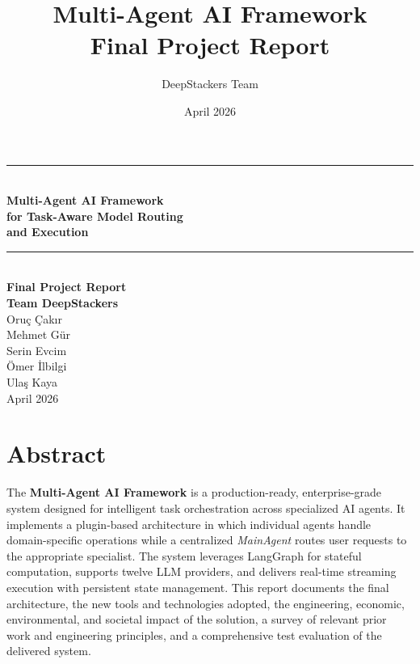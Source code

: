 \documentclass[11pt,a4paper]{report}
\title{\Huge\sffamily\bfseries Multi-Agent AI Framework\\[0.4em]
\LARGE\mdseries Final Project Report}
\author{\sffamily DeepStackers Team}
\date{\sffamily April 2026}
\begin{document}
\begin{titlepage}
  \centering
  \vspace*{2cm}
  {\color{RuleGray}\rule{\linewidth}{0.8pt}}\\[1.5em]
  {\sffamily\Huge\bfseries\color{PrimaryBlue} Multi-Agent AI Framework}\\[1.5em]
  {\sffamily\LARGE\bfseries\color{PrimaryBlue} for Task-Aware Model Routing}\\[1.5em]
  {\sffamily\LARGE\bfseries\color{PrimaryBlue} and Execution}\\[1.5em]
  {\color{RuleGray}\rule{\linewidth}{0.8pt}}\\[1.5em]

  {\sffamily\Large\bfseries Final Project Report}\\[2.5em]

  {\sffamily\large\bfseries\color{PrimaryBlue} Team DeepStackers}\\[1.2em]

  {\sffamily\large Oruç Çakır}\\[0.35em]
  {\sffamily\large Mehmet Gür}\\[0.35em]
  {\sffamily\large Serin Evcim}\\[0.35em]
  {\sffamily\large Ömer İlbilgi}\\[0.35em]
  {\sffamily\large Ulaş Kaya}\\[2em]

  {\sffamily\normalsize April 2026}
\end{titlepage}

\setcounter{tocdepth}{2}
\tableofcontents
\clearpage

\chapter*{Abstract}
\thispagestyle{plain}
The \textbf{Multi-Agent AI Framework} is a production-ready, enterprise-grade
system designed for intelligent task orchestration across specialized AI
agents. It implements a plugin-based architecture in which individual agents
handle domain-specific operations while a centralized \emph{MainAgent} routes
user requests to the appropriate specialist. The system leverages LangGraph
for stateful computation, supports twelve LLM providers, and delivers
real-time streaming execution with persistent state management. This report
documents the final architecture, the new tools and technologies adopted, the
engineering, economic, environmental, and societal impact of the solution, a
survey of relevant prior work and engineering principles, and a comprehensive
test evaluation of the delivered system.
\end{document}
